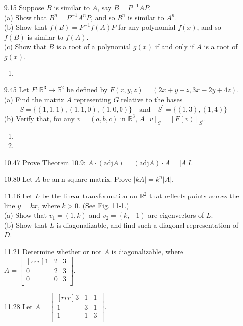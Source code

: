 \documentclass[12pt]{article}
\theoremstyle{definition}
\theoremstyle{plain}
\begin{document}
\begin{enumerate}
\item[9.15]Suppose $B$ is similar to $A$, say $B=P^{-1}AP$.\\
(a) Show that $B^n=P^{-1}A^nP$, and so $B^n$ is similar to $A^n$.\\
(b) Show that $f(B)=P^{-1}f(A)P$ for any polynomial $f(x)$, and so $f(B)$ is similar to $f(A)$.\\
(c) Show that $B$ is a root of a polynomial $g(x)$ if and only if $A$ is a root of $g(x)$.
	\begin{enumerate}
	\item
	\end{enumerate}
\item[9.45]Let $F:\mathbb{R}^3\rightarrow\mathbb{R}^2$ be defined by $F(x,y,z)=(2x+y-z,3x-2y+4z)$.\\
(a) Find the matrix $A$ representing $G$ relative to the bases
\[ S=\{(1,1,1),(1,1,0),(1,0,0)\} \quad \mathrm{and} \quad S^\prime = \{(1,3),(1,4)\} \]
(b) Verify that, for any $v=(a,b,c)$ in $\mathbb{R}^3$, $A[v]_S=[F(v)]_{S^\prime}$.
	\begin{enumerate}
	\item
	\item
	\end{enumerate}
\item[10.47]Prove Theorem 10.9: $A\cdot (\mathrm{adj}A)=(\mathrm{adj}A)\cdot A = |A|I$.
\item[10.80]Let $A$ be an n-square matrix. Prove $|kA|=k^n|A|$.
\item[11.16]Let $L$ be the linear transformation on $\mathbb{R}^2$ that reflects points across the line $y=kx$, where $k > 0$. (See Fig. 11-1.)\\
(a) Show that $v_1=(1,k)$ and $v_2=(k,-1)$ are eigenvectors of $L$.\\
(b) Show that $L$ is diagonalizable, and find such a diagonal representation of $D$.
\item[11.21]Determine whether or not $A$ is diagonalizable, where $A=\begin{bmatrix}[rrr]1&2&3\\0&2&3\\0&0&3\\\end{bmatrix}$.
\item[11.28]Let $A=\begin{bmatrix}[rrr]3&1&1\\1&3&1\\1&1&3\\\end{bmatrix}$.\\

\end{enumerate}
\end{document}
